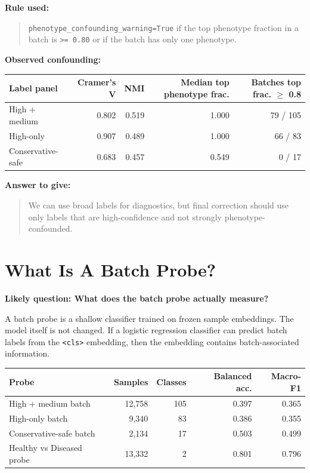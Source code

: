 \documentclass[11pt]{article}
\newcommand{\code}[1]{\texttt{\small #1}}
\begin{document}
\textbf{Rule used:}

\begin{quote}
\code{phenotype\_confounding\_warning=True} if the top phenotype fraction in a batch is
\code{>= 0.80} or if the batch has only one phenotype.
\end{quote}

\textbf{Observed confounding:}

\begin{center}
\begin{tabular}{lrrrr}
\toprule
Label panel & Cramer's V & NMI & Median top phenotype frac. & Batches top frac. $\geq$ 0.8 \\
\midrule
High + medium & 0.802 & 0.519 & 1.000 & 79 / 105 \\
High-only & 0.907 & 0.489 & 1.000 & 66 / 83 \\
Conservative-safe & 0.683 & 0.457 & 0.549 & 0 / 17 \\
\bottomrule
\end{tabular}
\end{center}

\textbf{Answer to give:}

\begin{quote}
We can use broad labels for diagnostics, but final correction should use only labels that
are high-confidence and not strongly phenotype-confounded.
\end{quote}

\section{What Is A Batch Probe?}

\textbf{Likely question: What does the batch probe actually measure?}

A batch probe is a shallow classifier trained on frozen sample embeddings. The model
itself is not changed. If a logistic regression classifier can predict batch labels from
the \code{<cls>} embedding, then the embedding contains batch-associated information.

\begin{center}
\begin{tabular}{lrrrr}
\toprule
Probe & Samples & Classes & Balanced acc. & Macro-F1 \\
\midrule
High + medium batch & 12,758 & 105 & 0.397 & 0.365 \\
High-only batch & 9,340 & 83 & 0.386 & 0.355 \\
Conservative-safe batch & 2,134 & 17 & 0.503 & 0.499 \\
Healthy vs Diseased probe & 13,332 & 2 & 0.801 & 0.796 \\
\bottomrule
\end{tabular}
\end{center}
\end{document}

